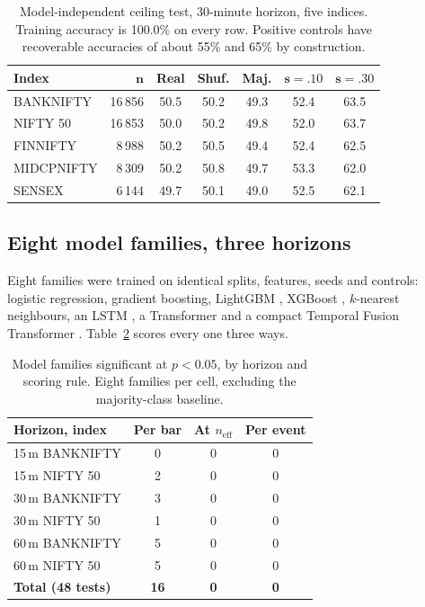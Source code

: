 \documentclass[sigconf,nonacm]{acmart}
\begin{document}
\begin{table}[t]
\caption{Model-independent ceiling test, 30-minute horizon, five indices.
Training accuracy is 100.0\% on every row. Positive controls have recoverable
accuracies of about 55\% and 65\% by construction.}
\label{tab:ceiling}
\small
\begin{tabular}{@{}lrccccc@{}}
\toprule
\textbf{Index} & $\boldsymbol{n}$ & \textbf{Real} & \textbf{Shuf.} &
\textbf{Maj.} & $\boldsymbol{s{=}.10}$ & $\boldsymbol{s{=}.30}$ \\
\midrule
BANKNIFTY & 16\,856 & 50.5 & 50.2 & 49.3 & 52.4 & 63.5 \\
NIFTY 50 & 16\,853 & 50.0 & 50.2 & 49.8 & 52.0 & 63.7 \\
FINNIFTY & 8\,988 & 50.2 & 50.5 & 49.4 & 52.4 & 62.5 \\
MIDCPNIFTY & 8\,309 & 50.2 & 50.8 & 49.7 & 53.3 & 62.0 \\
SENSEX & 6\,144 & 49.7 & 50.1 & 49.0 & 52.5 & 62.1 \\
\bottomrule
\end{tabular}
\end{table}

\subsection{Eight model families, three horizons}

Eight families were trained on identical splits, features, seeds and controls:
logistic regression, gradient boosting, LightGBM \cite{ke2017}, XGBoost
\cite{chen2016}, $k$-nearest neighbours, an
LSTM \cite{hochreiter1997}, a Transformer \cite{vaswani2017} and a compact
Temporal Fusion Transformer \cite{lim2021}. Table~\ref{tab:all} scores every one
three ways.

\begin{table}[t]
\caption{Model families significant at $p<0.05$, by horizon and scoring rule.
Eight families per cell, excluding the majority-class baseline.}
\label{tab:all}
\small
\begin{tabular}{@{}lccc@{}}
\toprule
\textbf{Horizon, index} & \textbf{Per bar} & \textbf{At $n_{\text{eff}}$} &
\textbf{Per event} \\
\midrule
15\,m BANKNIFTY & 0 & 0 & 0 \\
15\,m NIFTY 50 & 2 & 0 & 0 \\
30\,m BANKNIFTY & 3 & 0 & 0 \\
30\,m NIFTY 50 & 1 & 0 & 0 \\
60\,m BANKNIFTY & 5 & 0 & 0 \\
60\,m NIFTY 50 & 5 & 0 & 0 \\
\midrule
\textbf{Total (48 tests)} & \textbf{16} & \textbf{0} & \textbf{0} \\
\bottomrule
\end{tabular}
\end{table}
\end{document}
